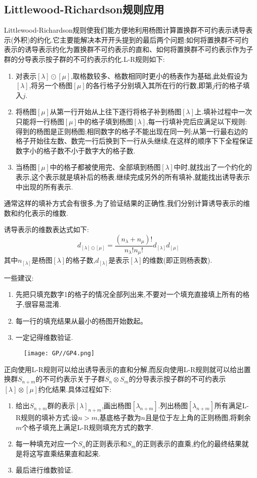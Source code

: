 \documentclass{ctexart}
\begin{document}
\subsection{Littlewood-Richardson规则应用}

Littlewood-Richardson规则使我们能方便地利用杨图计算置换群不可约表示诱导表示(外积)的约化.它主要能解决本开开头提到的最后两个问题:如何将置换群不可约表示的诱导表示约化为置换群不可约表示的直和、如何将置换群不可约表示作为子群的分导表示按子群的不可约表示约化.L-R规则如下:
\begin{enumerate}
    \item 对表示$[\lambda]\odot[\mu]$,取格数较多、格数相同时更小的杨表作为基础,此处假设为$[\lambda]$,将另一个杨图$[\mu]$的各行格子分别填入其所在行的行数,即第$j$行的格子填入$j$.
    \item 将杨图$[\mu]$从第一行开始从上往下逐行将格子补到杨图$[\lambda]$上.填补过程中一次只能将一行杨图$[\mu]$中的格子填到杨图$[\lambda]$,每一行填补完后应满足以下规则:得到的杨图是正则杨图;相同数字的格子不能出现在同一列;从第一行最右边的格子开始往左数、数完一行后换到下一行从头继续,在这样的顺序下下全程保证数字小的格子数不小于数字大的格子数.
    \item 当杨图$[\mu]$中的格子都被使用完、全部填到杨图$[\lambda]$中时,就找出了一个约化的表示,这个表示就是填补后的杨表.继续完成另外的所有填补,就能找出诱导表示中出现的所有表示.
\end{enumerate}

通常这样的填补方式会有很多,为了验证结果的正确性,我们分别计算诱导表示的维数和约化表示的维数.

诱导表示的维数表达式如下:\[d_{[\lambda]\odot[\mu]}=\frac{(n_{\lambda}+n_{\mu})!}{n_{\lambda}!n_{\mu}!}d_{[\lambda]}d_{[\mu]}\]其中$n_{[\lambda]}$是杨图$[\lambda]$的格子数,$d_{[\lambda]}$是表示$[\lambda]$的维数(即正则杨表数).

一些建议:\begin{enumerate}
    \item 先把只填充数字1的格子的情况全部列出来,不要对一个填充直接填上所有的格子,很容易混淆.
    \item 每一行的填充结果从最小的杨图开始数起。
    \item 一定记得维数验证.
\end{enumerate}

\begin{figure}[H]
    \centering
    \texttt{[image: GP//GP4.png]}
\end{figure}

正向使用L-R规则可以给出诱导表示的直和分解,而反向使用L-R规则就可以给出置换群$S_{n+m}$的不可约表示关于子群$S_{n}\otimes S_{m}$的分导表示按子群的不可约表示$[\lambda]\otimes[\mu]$约化结果.具体过程如下:\begin{enumerate}
    \item 给出$S_{n+m}$群的表示$[\lambda]_{n+m}$,画出杨图$[\lambda_{n+m}]$.列出杨图$[\lambda_{n+m}]$所有满足L-R规则的填补方式:设$n>m$,基底格子数为$n$且是位于左上角的正则杨图,将剩余$m$个格子填充上满足L-R规则填充方式的数字.
    \item 每一种填充对应一个$S_{n}$的正则表示和$S_{m}$的正则表示的直乘,约化的最终结果就是将这写直乘结果直和起来.
    \item 最后进行维数验证.
\end{enumerate}
\end{document}
